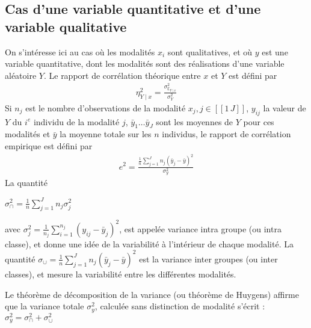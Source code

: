 \documentclass[letterpaper,10pt,english]{jupyterBook}
\begin{document}
\subsection{Cas d’une variable quantitative et d’une variable qualitative}
\label{\detokenize{statsdescriptives:cas-d-une-variable-quantitative-et-d-une-variable-qualitative}}
\sphinxAtStartPar
On s’intéresse ici au cas où les modalités \(x_i\) sont qualitatives, et où \(y\) est une variable quantitative, dont les modalités sont des réalisations d’une variable aléatoire \(Y\).
Le rapport de corrélation théorique entre \(x\) et \(Y\) est défini par
\begin{equation*}
\begin{split}\eta^2_{Y\mid x} = \frac{\sigma^2_{\mathbb{E}_{Y\mid x}}}{\sigma^2_Y}\end{split}
\end{equation*}
\sphinxAtStartPar
Si \(n_j\) est le nombre d’observations de la modalité \(x_j,j\in[\![1\,J]\!]\), \(y_{ij}\) la valeur de \(Y\) du \(i^e\) individu de la modalité \(j\), \(\bar{y}_1\ldots \bar{y}_J\) sont les moyennes de \(Y\) pour ces modalités et \(\bar{y}\) la moyenne totale sur les \(n\) individus, le rapport de corrélation empirique est défini par
\begin{equation*}
\begin{split}e^2 = \frac{\frac{1}{n}\displaystyle\sum_{j=1}^J n_j\left (\bar{y}_j-\bar{y}\right )^2}{\sigma^2_y}\end{split}
\end{equation*}
\sphinxAtStartPar
La quantité

\sphinxAtStartPar
\(\sigma^2_\cap = \frac{1}{n}\displaystyle\sum_{j=1}^J n_j\sigma_j^2\)

\sphinxAtStartPar
avec \(\sigma_j^2 =  \frac{1}{n_j}\displaystyle\sum_{i=1}^{n_j}\left (y_{ij}-\bar{y}_j \right )^2\),  est appelée variance intra groupe (ou intra classe), et donne une idée de la variabilité à l’intérieur de chaque modalité.
La quantité
\(\sigma_\cup = \frac{1}{n}\displaystyle\sum_{j=1}^J n_j\left (\bar{y}_j-\bar{y}\right )^2\)
est la variance inter groupes (ou inter classes), et mesure la variabilité entre les différentes modalités.

\sphinxAtStartPar
Le théorème de décomposition de la variance (ou théorème de Huygens) affirme que la variance totale \(\sigma^2_y\), calculée sans distinction de modalité s’écrit :
\(\sigma^2_y = \sigma^2_\cap + \sigma^2_\cup\)
\end{document}
